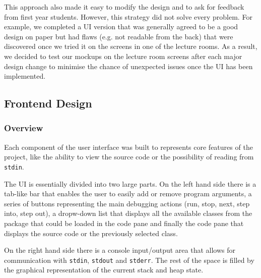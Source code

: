 \documentclass[11pt, a4paper]{article}
\begin{document}
This approach also made it easy to modify the design and to ask for feedback from first year students.
However, this strategy did not solve every problem.
For example, we completed a UI version that was generally agreed to be a good design on paper but had flaws (e.g. not readable from the back) that were discovered once we tried it on the screens in one of the lecture rooms.
As a result, we decided to test our mockups on the lecture room screens after each major design change to minimise the chance of unexpected issues once the UI has been implemented.

\subsection{Frontend Design}
\subsubsection{Overview}

Each component of the user interface was built to represents core features of the project, like the ability to view the source code or the possibility of reading from \texttt{stdin}.

The UI is essentially divided into two large parts.
On the left hand side there is a tab-like bar that enables the user to easily add or remove program arguments, a series of buttons representing the main debugging actions (run, stop, next, step into, step out), a dropw-down list that displays all the available classes from the package that could be loaded in the code pane and finally the code pane that displays the source code or the previously selected class.

On the right hand side there is a console input/output area that allows for communication with \texttt{stdin}, \texttt{stdout} and \texttt{stderr}. The rest of the space is filled by the graphical representation of the current stack and heap state.
\end{document}
